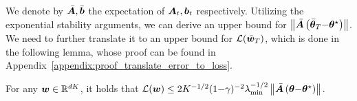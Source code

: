 % 
% 
% 
We denote by $\bar{{\bm{A}}},\bar{{\bm{b}}}$ the expectation of ${\bm{A}}_t,{\bm{b}}_t$ respectively.
Utilizing the exponential stability arguments, we can derive an upper bound for $\left\|{\bar{{\bm{A}}}\left({\bar{{\bm{\theta}}}_T{-}{\bm{\theta}}^{\star}}\right)}\right\|$.
We need to further translate it to an upper bound for ${\mathcal{L}}(\bar{{\bm{w}}}_T)$, which is done in the following lemma, whose proof can be found in Appendix~\ref{appendix:proof_translate_error_to_loss}.
\begin{lemma}\label{lem:translate_error_to_loss}
For any ${\bm{w}}\in{\mathbb R}^{dK}$, it holds that ${\mathcal{L}}({\bm{w}})\leq2{K^{-1/2}(1{-}\gamma)^{-2}\lambda_{\min}^{-1/2}} \left\|{\bar{{\bm{A}}}\left({{{\bm{\theta}}}{-}{\bm{\theta}}^{\star}}\right)}\right\|$.
\end{lemma}
